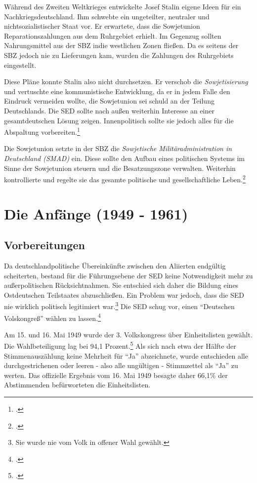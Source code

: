 \documentclass[12pt,a4paper]{article}
\begin{document}
Während des Zweiten Weltkrieges entwickelte Josef Stalin eigene Ideen für ein Nachkriegsdeutschland. Ihm schwebte ein ungeteilter, neutraler und nichtsozialistischer Staat vor. Er erwartete, dass die Sowjetunion Reparationszahlungen aus dem Ruhrgebiet erhielt. Im Gegenzug sollten Nahrungsmittel aus der SBZ indie westlichen Zonen fließen. Da es seitens der SBZ jedoch nie zu Lieferungen kam, wurden die Zahlungen des Ruhrgebiets eingestellt.

Diese Pläne konnte Stalin also nicht durchsetzen. Er verschob die \textit{Sowjetisierung} und vertuschte eine kommunistische Entwicklung, da er in jedem Falle den Eindruck vermeiden wollte, die Sowjetunion sei schuld an der Teilung Deutschlands. Die SED sollte nach außen weiterhin Interesse an einer gesamtdeutschen Lösung zeigen. Innenpolitisch sollte sie jedoch alles für die Abspaltung vorbereiten.\footcite{izpb:weg-diktatur}

Die Sowjetunion setzte in der SBZ die \textit{Sowjetische Militäradministration in Deutschland (SMAD)} ein. Diese sollte den Aufbau eines politischen Systems im Sinne der Sowjetunion steuern und die Besatzungszone verwalten. Weiterhin kontrollierte und regelte sie das gesamte politische und gesellschaftliche Leben.\footcite{wiki:ddr}



\newpage



\section{Die Anfänge (1949 - 1961)}
\label{sec:die-anfaenge}


\subsection{Vorbereitungen}
\label{anfange:vorbereitungen}

Da deutschlandpolitische Übereinkünfte zwischen den Aliierten endgültig scheiterten, bestand für die Führungsebene der SED keine Notwendigkeit mehr zu außerpolitischen Rücksichtnahmen. Sie entschied sich daher die Bildung eines Ostdeutschen Teilstaates abzuschließen. Ein Problem war jedoch, dass die SED nie wirklich politisch legitimiert war.\footnote{Sie wurde nie vom Volk in offener Wahl gewählt.} Die SED schug vor, einen \enquote{Deutschen Volskongreß} wählen zu lassen.\footcite{izpb:ausbau-system}

Am 15. und 16. Mai 1949 wurde der 3. Volkskongress über Einheitslisten gewählt. Die Wahlbeteiligung lag bei 94,1 Prozent.\footcite{izpb:ausbau-system} Als sich nach etwa der Hälfte der Stimmenauszählung keine Mehrheit für \enquote{Ja} abzeichnete, wurde entschieden alle durchgestrichenen oder leeren - also alle ungültigen - Stimmzettel als \enquote{Ja} zu werten. Das offizielle Ergebnis vom 16. Mai 1949 besagte daher 66,1\% der Abstimmenden befürworteten die Einheitslisten.
\end{document}
